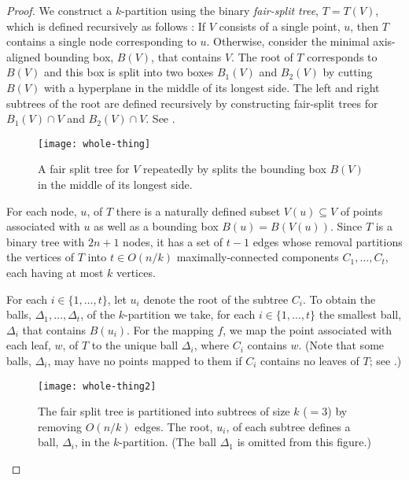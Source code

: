 \documentclass{patmorin}
\begin{document}
\begin{proof}
  We construct a $k$-partition using the binary \emph{fair-split
  tree}, $T=T(V)$, which is defined recursively as follows
  \cite{callahan.kosaraju:decomposition}: If $V$ consists of a single
  point, $u$, then $T$ contains a single node corresponding to $u$.
  Otherwise, consider the minimal axis-aligned bounding box, $B(V)$,
  that contains $V$.  The root of $T$ corresponds to $B(V)$ and this
  box is split into two boxes $B_1(V)$ and $B_2(V)$ by cutting $B(V)$
  with a hyperplane in the middle of its longest side.  The left and
  right subtrees of the root are defined recursively by constructing
  fair-split trees for $B_1(V)\cap V$ and $B_2(V)\cap V$. See .

  \begin{figure}
    \begin{center}
      \texttt{[image: whole-thing]}
    \end{center}
    \caption{A fair split tree for $V$ repeatedly by splits the bounding
      box $B(V)$ in the middle of its longest side.}
  \end{figure}

  For each node, $u$, of $T$ there is a naturally defined subset
  $V(u)\subseteq V$ of points associated with $u$ as well as a bounding
  box $B(u)=B(V(u))$.  Since $T$ is a binary tree with $2n+1$ nodes, it
  has a set of $t-1$ edges whose removal partitions the vertices of $T$
  into $t\in O(n/k)$ maximally-connected components $C_1,\ldots,C_t$,
  each having at most $k$ vertices.

  For each $i\in\{1,\ldots,t\}$, let $u_i$ denote the root of the
  subtree $C_i$.  To obtain the balls, $\Delta_1,\ldots,\Delta_t$, of
  the $k$-partition we take, for each $i\in\{1,\ldots,t\}$ the smallest
  ball, $\Delta_i$ that contains $B(u_i)$.  For the mapping $f$, we
  map the point associated with each leaf, $w$, of $T$ to the unique
  ball $\Delta_i$, where $C_i$ contains $w$.  (Note that some balls,
  $\Delta_i$, may have no points mapped to them if $C_i$ contains no
  leaves of $T$; see .)

  \begin{figure}
    \begin{center}
      \texttt{[image: whole-thing2]}
    \end{center}
    \caption{The fair split tree is partitioned into subtrees of size
    $k$ (${}=3$) by removing $O(n/k)$ edges.  The root, $u_i$, of each subtree
    defines a ball, $\Delta_i$, in the $k$-partition. (The ball $\Delta_1$
    is omitted from this figure.)}
  \end{figure}



\end{proof}
\end{document}
